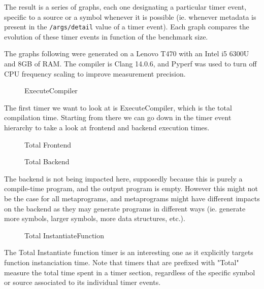 \documentclass[../main]{subfiles}
\begin{document}
The result is a series of graphs, each one designating a particular timer event,
specific to a source or a symbol whenever it is possible (ie. whenever metadata
is present in the \lstinline{/args/detail} value of a timer event). Each graph
compares the evolution of these timer events in function of the benchmark size.

The graphs following were generated on a Lenovo T470 with an Intel i5 6300U and
8GB of RAM. The compiler is Clang 14.0.6, and Pyperf\cite{pyperf} was used
to turn off CPU frequency scaling to improve measurement precision.

\begin{figure}[h]
\fontsize{8}{10}\selectfont

\caption{ExecuteCompiler}
\end{figure}

The first timer we want to look at is ExecuteCompiler, which is the total
compilation time. Starting from there we can go down in the timer event
hierarchy to take a look at frontend and backend execution times.

\begin{figure}[h]
\fontsize{8}{10}\selectfont

\caption{Total Frontend}
\end{figure}

\begin{figure}[h]
\fontsize{8}{10}\selectfont

\caption{Total Backend}
\end{figure}

The backend is not being impacted here, supposedly because this is purely a
compile-time program, and the output program is empty. However this might not be
the case for all metaprograms, and metaprograms might have different impacts on
the backend as they may generate programs in different ways (ie. generate more
symbols, larger symbols, more data structures, etc.).

\begin{figure}[h]
\fontsize{8}{10}\selectfont

\caption{Total InstantiateFunction}
\end{figure}

The Total Instantiate function timer is an interesting one as it explicitly
targets function instanciation time. Note that timers that are prefixed with
"Total" measure the total time spent in a timer section, regardless of the
specific symbol or source associated to its individual timer events.
\end{document}
